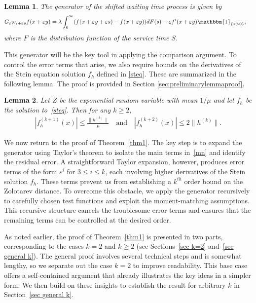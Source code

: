\documentclass[11pt,letterpaper,reqno]{article}
\theoremstyle{thmstyleone}%
\theoremstyle{thmstyletwo}%
\newtheorem{lemma}{Lemma}
\theoremstyle{thmstylethree}%
\numberwithin{equation}{section}
\begin{document}
\begin{lemma}\label{lemma1}
The generator of the shifted waiting time process is given by
\begin{align}\label{gen}
    G_{\varepsilon W_t+\varepsilon y}f(x+\varepsilon y)&=\lambda \int_0^\infty (f(x+\varepsilon y +\varepsilon s)-f(x+\varepsilon y))dF(s)-\varepsilon f'(x+\varepsilon y)\mathbbm{1}_{\{x>0\}},
\end{align}
where $F$ is the distribution function of the service time $S$.
\end{lemma}
This generator will be the key tool in applying the comparison argument. To control the error terms that arise,%
we also require bounds on the derivatives of the Stein equation solution $f_h$ defined in \eqref{steq}. These are summarized in the following lemma. The proof is provided in Section \ref{sec:preliminarylemmaproof}.
\begin{lemma}\label{lemma3}
Let $Z$ be the exponential random variable with mean $1/\mu$ and let $f_h$ be the solution to~\eqref{steq}. Then for any $k\geq 2$,
\begin{align*}
       |f_h^{(k+1)}(x)| \leq \frac{ \|h^{(k)}\|}{\mu} \quad\text{and}\quad |f_h^{(k+2)}(x)| \leq 2\|h^{(k)}\|.
\end{align*}
\end{lemma}
We now return to the proof of Theorem~\ref{thm1}. The key step is to expand the generator using Taylor’s theorem to isolate the main terms in~\eqref{mn} and identify the residual error. A straightforward Taylor expansion, however, produces error terms of the form $\varepsilon^i$ for $3 \leq i \leq k$, each involving higher derivatives of the Stein solution $f_h$. 
These terms prevent us from establishing a $k^{th}$ order bound on the Zolotarev distance. To overcome this obstacle, we apply the generator recursively to carefully chosen test functions and exploit the moment-matching assumptions. This recursive structure cancels the troublesome error terms and ensures that the remaining terms can be controlled at the desired order.
 
As noted earlier, the proof of Theorem~\ref{thm1} is presented in two parts, corresponding to the cases $k=2$ and $k \geq 2$ (see Sections~\ref{sec k=2} and~\ref{sec general k}). The general proof involves several technical steps and is somewhat lengthy, so we separate out the case $k=2$ to improve readability. This base case offers a self-contained argument that already illustrates the key ideas in a simpler form. We then build on these insights to establish the result for arbitrary $k$ in Section~\ref{sec general k}.
\end{document}
